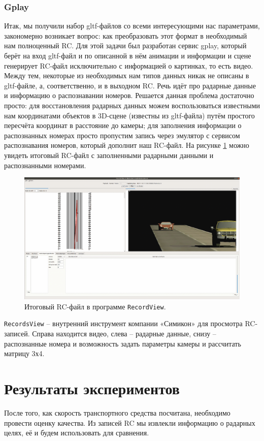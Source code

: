 \documentclass[specification,annotation,times]{itmo-student-thesis}
\begin{document}
	\subsection{Gplay}
	Итак, мы получили набор gltf-файлов со всеми интересующими нас параметрами, закономерно возникает вопрос: как преобразовать этот формат в необходимый нам полноценный RC. Для этой задачи был разработан сервис gplay, который берёт на вход gltf-файл и по описанной в нём анимации и информации и сцене генерирует RC-файл исключительно с информацией о картинках, то есть видео. Между тем, некоторые из необходимых нам типов данных никак не описаны в gltf-файле, а, соответственно, и в выходном RC. Речь идёт про радарные данные и информацию о распознавании номеров. Решается данная проблема достаточно просто: для восстановления радарных данных можем воспользоваться известными нам координатами объектов в 3D-сцене (известны из gltf-файла) путём простого пересчёта координат в расстояние до камеры; для заполнения информации о распознанных номерах просто пропустим запись через эмулятор с сервисом распознавания номеров, который дополнит наш RC-файл. На рисунке \ref{img:rv} можно увидеть итоговый RC-файл с заполненными радарными данными и распознанными номерами.
	
	\begin{figure}[!ht]
		\caption{Итоговый RC-файл в программе \texttt{RecordView}.}\label{img:rv}
		\includegraphics[width=0.85\linewidth]{../png/recordsview.png}
		\centering
	\end{figure}
	
	\texttt{RecordsView} – внутренний инструмент компании «Симикон» для просмотра RC-записей. Справа находится видео, слева – радарные данные, снизу – распознанные номера и возможность задать параметры камеры и рассчитать матрицу 3х4.
	
	
	\chapter{Результаты экспериментов}
	После того, как скорость транспортного средства посчитана, необходимо провести оценку качества. Из записей RC мы извлекли информацию о радарных целях, её и будем использовать для сравнения.
	
\end{document}
